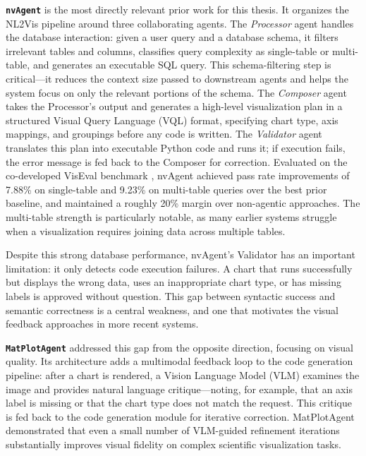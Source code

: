 \documentclass[a4paper,oneside,bibliography=totoc]{scrbook}
\begin{document}
\textbf{\texttt{nvAgent}} \cite{ouyang2025nvagent} is the most directly relevant prior work for this thesis. It organizes the NL2Vis pipeline around three collaborating agents. The \emph{Processor} agent handles the database interaction: given a user query and a database schema, it filters irrelevant tables and columns, classifies query complexity as single-table or multi-table, and generates an executable SQL query. This schema-filtering step is critical---it reduces the context size passed to downstream agents and helps the system focus on only the relevant portions of the schema. The \emph{Composer} agent takes the Processor's output and generates a high-level visualization plan in a structured Visual Query Language (VQL) format, specifying chart type, axis mappings, and groupings before any code is written. The \emph{Validator} agent translates this plan into executable Python code and runs it; if execution fails, the error message is fed back to the Composer for correction. Evaluated on the co-developed VisEval benchmark \cite{chen2025viseval}, nvAgent achieved pass rate improvements of 7.88\% on single-table and 9.23\% on multi-table queries over the best prior baseline, and maintained a roughly 20\% margin over non-agentic approaches. The multi-table strength is particularly notable, as many earlier systems struggle when a visualization requires joining data across multiple tables.

Despite this strong database performance, nvAgent's Validator has an important limitation: it only detects code execution failures. A chart that runs successfully but displays the wrong data, uses an inappropriate chart type, or has missing labels is approved without question. This gap between syntactic success and semantic correctness is a central weakness, and one that motivates the visual feedback approaches in more recent systems.

\textbf{\texttt{MatPlotAgent}} \cite{yang2024matplotagent} addressed this gap from the opposite direction, focusing on visual quality. Its architecture adds a multimodal feedback loop to the code generation pipeline: after a chart is rendered, a Vision Language Model (VLM) examines the image and provides natural language critique---noting, for example, that an axis label is missing or that the chart type does not match the request. This critique is fed back to the code generation module for iterative correction. MatPlotAgent demonstrated that even a small number of VLM-guided refinement iterations substantially improves visual fidelity on complex scientific visualization tasks.
\end{document}
